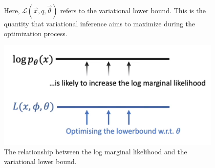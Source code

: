 \documentclass[11pt]{article}
\begin{document}
\begin{figure}[H]
    \centering
    \caption*{Here, $\mathcal L (\vec x, q, \vec \theta)$ refers to the variational lower bound. This is the quantity that variational inference aims to maximize during the optimization process.}
\end{figure}

\begin{figure}[H]
    \centering
    \includegraphics[width=.6\linewidth]{figures/variational-a-e.png}
    \caption{The relationship between the log marginal likelihood and the variational lower bound. }
\end{figure}
\end{document}
